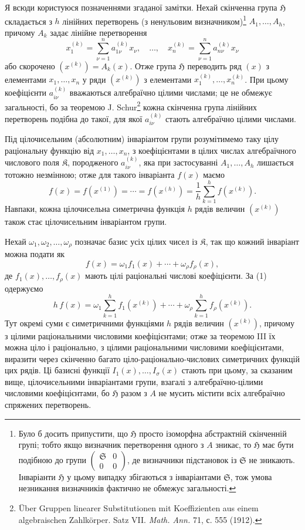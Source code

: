 \documentclass[11pt]{article}
\providecommand{\frH}{\mathfrak H}
\providecommand{\frK}{\mathfrak K}
\providecommand{\frS}{\mathfrak S}
\begin{document}
Я всюди користуюся позначеннями згаданої замітки. Нехай скінченна група \(\frH\) складається з \(h\) лінійних перетворень (з ненульовим визначником)\footnote{Було б досить припустити, що \(\frH\) просто ізоморфна абстрактній скінченній групі; тобто якщо визначник перетворення одного з \(A\) зникає, то \(\frH\) має бути подібною до групи \(\begin{pmatrix}\frS&0\\0&0\end{pmatrix}\), де визначники підстановок із \(\frS\) не зникають. Інваріанти \(\frH\) у цьому випадку збігаються з інваріантами \(\frS\), тож умова незникання визначників фактично не обмежує загальності.} \(A_1,\ldots,A_h\), причому \(A_k\) задає лінійне перетворення
\[
        x_1^{(k)}=\sum_{\nu=1}^{n}a_{1\nu}^{(k)}x_\nu,
        \quad\ldots,\quad
        x_n^{(k)}=\sum_{\nu=1}^{n}a_{n\nu}^{(k)}x_\nu
\]
або скорочено \((x^{(k)})=A_k(x)\). Отже група \(\frH\) переводить ряд \((x)\) з елементами \(x_1,\ldots,x_n\) у ряди \((x^{(k)})\) з елементами \(x_1^{(k)},\ldots,x_n^{(k)}\). При цьому коефіцієнти \(a_{i\nu}^{(k)}\) вважаються алгебраїчно цілими числами; це не обмежує загальності, бо за теоремою J. Schur\footnote{Über Gruppen linearer Substitutionen mit Koeffizienten aus einem algebraischen Zahlkörper. Satz VII. \emph{Math. Ann.} 71, с. 555 (1912).} кожна скінченна група лінійних перетворень подібна до такої, для якої \(a_{i\nu}^{(k)}\) стають алгебраїчно цілими числами.

Під цілочисельним (абсолютним) інваріантом групи розумітимемо таку цілу раціональну функцію від \(x_1,\ldots,x_n\), з коефіцієнтами в цілих числах алгебраїчного числового поля \(\frK\), породженого \(a_{i\nu}^{(k)}\), яка при застосуванні \(A_1,\ldots,A_h\) лишається тотожно незмінною; отже для такого інваріанта \(f(x)\) маємо
\begin{equation}
        f(x)=f(x^{(1)})=\cdots=f(x^{(h)})
        =\frac1h\sum_{k=1}^{h}f(x^{(k)}).
\end{equation}
Навпаки, кожна цілочисельна симетрична функція \(h\) рядів величин \((x^{(k)})\) також стає цілочисельним інваріантом групи.

Нехай \(\omega_1,\omega_2,\ldots,\omega_\rho\) позначає базис усіх цілих чисел із \(\frK\), так що кожний інваріант можна подати як
\[
        f(x)=\omega_1 f_1(x)+\cdots+\omega_\rho f_\rho(x),
\]
де \(f_1(x),\ldots,f_\rho(x)\) мають цілі раціональні числові коефіцієнти. За (1) одержуємо
\[
        h\,f(x)
        =
        \omega_1\sum_{k=1}^{h}f_1(x^{(k)})
        +\cdots+
        \omega_\rho\sum_{k=1}^{h}f_\rho(x^{(k)}).
\]
Тут окремі суми є симетричними функціями \(h\) рядів величин \((x^{(k)})\), причому з цілими раціональними числовими коефіцієнтами; отже за теоремою III їх можна ціло і раціонально, з цілими раціональними числовими коефіцієнтами, виразити через скінченно багато ціло-раціонально-числових симетричних функцій цих рядів. Ці базисні функції \(I_1(x),\ldots,I_\sigma(x)\) стають при цьому, за сказаним вище, цілочисельними інваріантами групи, взагалі з алгебраїчно-цілими числовими коефіцієнтами, бо \(\frH\) разом з \(A\) не мусить містити всіх алгебраїчно спряжених перетворень.
\end{document}
